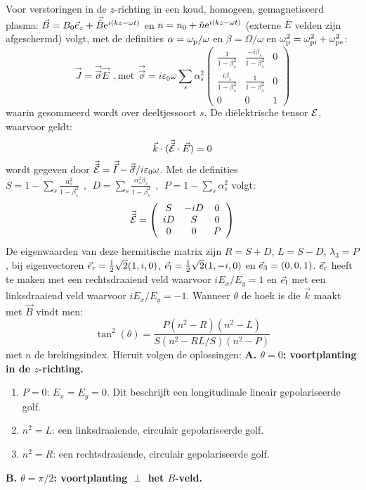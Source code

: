 Voor verstoringen in de $z$-richting in een koud, homogeen, gemagnetiseerd
plasma: $\vec{B}=B_0\vec{e}_z+\vec{\hat{B}}{\rm e}^{i(kz-\omega t)}$ en
$n=n_0+\hat{n}{\rm e}^{i(kz-\omega t)}$ (externe $E$ velden zijn afgeschermd)
volgt, met de definities $\alpha=\omega_{\rm p}/\omega$ en $\beta=\Omega/\omega$
en $\omega_{\rm p}^2=\omega_{\rm pi}^2+\omega_{\rm pe}^2$:
\[
\vec{J}=\vec{\vec{\sigma}}\vec{E}~~,\mbox{met}~~
\vec{\vec{\sigma}}=i\varepsilon_0\omega\sum_s\alpha_s^2
\left(\begin{array}{ccc}
\displaystyle\frac{1}{1-\beta_s^2}&\displaystyle\frac{-i\beta_s}{1-\beta_s^2}&0\\
\displaystyle\frac{i\beta_s}{1-\beta_s^2}&\displaystyle\frac{1}{1-\beta_s^2}&0\\
0&0&1
\end{array}\right)
\]
waarin gesommeerd wordt over deeltjessoort $s$. De di\"elektrische tensor
$\cal E$, waarvoor geldt:
\[
\vec{k}\cdot(\vec{\vec{{\cal E}}}\cdot\vec{E})=0
\]
wordt gegeven door
$\vec{\vec{{\cal E}}}=\vec{\vec{I}}-\vec{\vec{\sigma}}/i\varepsilon_0\omega$.
\npar
Met de definities
$\displaystyle S=1-\sum_s\frac{\alpha_s^2}{1-\beta_s^2}~~,~~
D=\sum_s\frac{\alpha_s^2\beta_s}{1-\beta_s^2}~~,~~
P=1-\sum_s\alpha_s^2$
\npar
volgt:
\[
\vec{\vec{{\cal E}}}=\left(\begin{array}{ccc}S&-iD&0\\iD&S&0\\0&0&P\end{array}\right)
\]
De eigenwaarden van deze hermitische matrix zijn $R=S+D$, $L=S-D$,
$\lambda_3=P$, bij eigenvectoren $\vec{e}_{\rm r}=\mbox{$\frac{1}{2}$}\sqrt{2}(1,i,0)$,
$\vec{e}_{\rm l}=\mbox{$\frac{1}{2}$}\sqrt{2}(1,-i,0)$ en $\vec{e}_{\rm 3}=(0,0,1)$. $\vec{e}_{\rm r}$ heeft te maken met
een rechtsdraaiend veld waarvoor $iE_x/E_y=1$ en $\vec{e}_{\rm l}$ met een
linksdraaiend veld waarvoor $iE_x/E_y=-1$. Wanneer $\theta$ de hoek is die
$\vec{k}$ maakt met $\vec{B}$ vindt men:
\[
\tan^2(\theta)=\frac{P(n^2-R)(n^2-L)}{S(n^2-RL/S)(n^2-P)}
\]
met $n$ de brekingsindex. Hieruit volgen de oplossingen:
\npar
{\bf A. \boldmath$\theta=0$: voortplanting in de $z$-richting.}
\begin{enumerate}
\item $P=0$: $E_x=E_y=0$. Dit beschrijft een longitudinale lineair
      gepolariseerde golf.
\item $n^2=L$: een linksdraaiende, circulair gepolariseerde golf.
\item $n^2=R$: een rechtsdraaiende, circulair gepolariseerde golf.
\end{enumerate}
{\bf B. \boldmath$\theta=\pi/2$: voortplanting $\perp$ het $B$-veld.}
